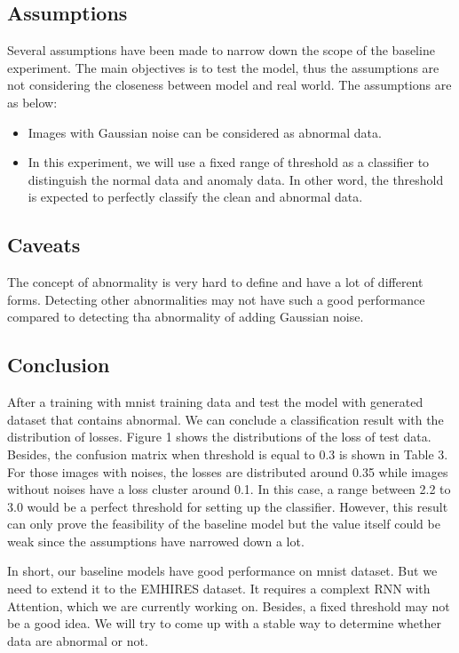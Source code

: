 \documentclass{article}
\begin{document}
\subsection{Assumptions}
Several assumptions have been made to narrow down the scope of the baseline experiment. The main objectives is to test the model, thus the assumptions are not considering the closeness between model and real world.
The assumptions are as below:
\begin{itemize}
    \item Images with Gaussian noise can be considered as abnormal data.
    \item In this experiment, we will use a fixed range of threshold as a classifier to distinguish the normal data and anomaly data. In other word, the threshold is expected to perfectly classify the clean and abnormal data. 
\end{itemize}

\subsection{Caveats}
The concept of abnormality is very hard to define and have a lot of different forms. Detecting other abnormalities may not have such a good performance compared to detecting tha abnormality of adding Gaussian noise. 

\subsection{Conclusion}
After a training with mnist training data and test the model with generated dataset that contains abnormal. We can conclude a classification result with the distribution of losses. Figure 1 shows the distributions of the loss of test data. Besides, the confusion matrix when threshold is equal to 0.3 is shown in Table 3.
For those images with noises, the losses are distributed around 0.35 while images without noises have a loss cluster around 0.1. In this case, a range between 2.2 to 3.0 would be a perfect threshold for setting up the classifier. However, this result can only
prove the feasibility of the baseline model but the value itself could be weak since the assumptions have narrowed down a lot. 

In short, our baseline models have good performance on mnist dataset. But we need to extend it to the EMHIRES dataset. It requires a complext RNN with Attention, which we are currently working on. Besides, a fixed threshold may not be a good idea. We will try to come up with a stable way to determine whether data are abnormal or not. 
\end{document}
